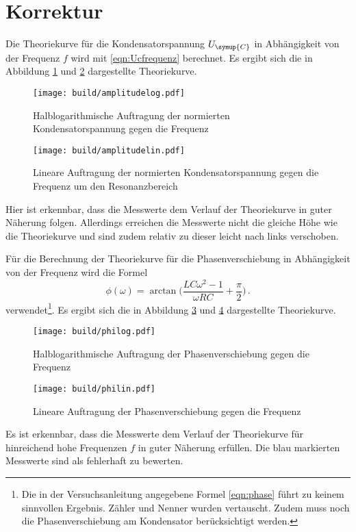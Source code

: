 \newpage
\section{Korrektur}
\label{sec:Korrektur}

Die Theoriekurve für die Kondensatorspannung $U_{\symup{C}}$ in Abhängigkeit
von der Frequenz $f$ wird mit \eqref{eqn:Ucfrequenz} berechnet. Es ergibt sich die
in Abbildung \ref{fig:amplitudelog2} und \ref{fig:amplitudelin2} dargestellte
Theoriekurve.

\begin{figure}
  \centering
  \texttt{[image: build/amplitudelog.pdf]}
  \caption{Halblogarithmische Auftragung der normierten Kondensatorspannung
  gegen die Frequenz}
  \label{fig:amplitudelog2}
\end{figure}

\begin{figure}
  \centering
  \texttt{[image: build/amplitudelin.pdf]}
  \caption{Lineare Auftragung der normierten Kondensatorspannung gegen die
  Frequenz um den Resonanzbereich}
  \label{fig:amplitudelin2}
\end{figure}

Hier ist erkennbar, dass die Messwerte dem Verlauf der Theoriekurve in guter
Näherung folgen. Allerdings erreichen die Messwerte nicht die gleiche Höhe wie
die Theoriekurve und sind zudem relativ zu dieser leicht nach links verschoben.



Für die Berechnung der Theoriekurve für die Phasenverschiebung in Abhängigkeit
von der Frequenz wird die Formel
\begin{equation}
  \phi(\omega)=\arctan\biggl(\frac{L C \omega^2-1}{\omega R C}+\frac{\pi}{2}\biggr)\,.
\end{equation}
verwendet\footnote{Die in der Versuchsanleitung angegebene Formel \eqref{eqn:phase}
führt zu keinem sinnvollen Ergebnis. Zähler und Nenner wurden
vertauscht. Zudem muss noch die Phasenverschiebung am Kondensator berücksichtigt
werden.}.
Es ergibt sich die in Abbildung \ref{fig:philog2} und \ref{fig:philin2}
dargestellte Theoriekurve.


\begin{figure}
  \centering
  \texttt{[image: build/philog.pdf]}
  \caption{Halblogarithmische Auftragung der Phasenverschiebung gegen die Frequenz}
  \label{fig:philog2}
\end{figure}

\begin{figure}
  \centering
  \texttt{[image: build/philin.pdf]}
  \caption{Lineare Auftragung der Phasenverschiebung gegen die Frequenz}
  \label{fig:philin2}
\end{figure}

Es ist erkennbar, dass die Messwerte dem Verlauf der Theoriekurve für hinreichend
hohe Frequenzen $f$ in guter Näherung erfüllen. Die blau markierten Messwerte
sind als fehlerhaft zu bewerten.
